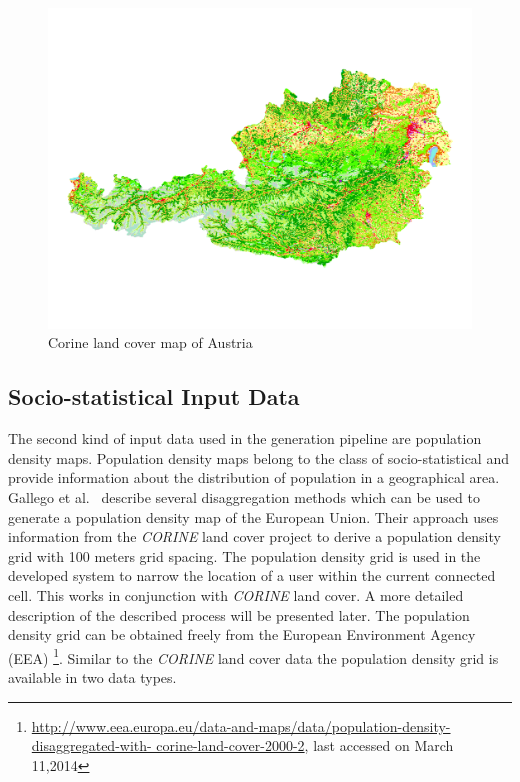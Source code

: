 \begin{figure}
	\centering
	\includegraphics[width=\linewidth]{./images/clc_austria}
	\caption{Corine land cover map of Austria}
	\label{fig:clc_austria}
\end{figure}

\subsection{Socio-statistical Input Data}
The second kind of input data used in the generation pipeline are population density maps. Population density maps belong to the class of socio-statistical and provide information about the distribution of population in a geographical area. Gallego et al.\ \cite{Gallego2010,Gallego2011} describe several disaggregation methods which can be used to generate a population density map of the European Union.
Their approach uses information from the \emph{CORINE} land cover project to derive a population density grid with 100 meters grid spacing. The population density grid is used in the developed system to narrow the location of a user within the current connected cell. This works in conjunction with \emph{CORINE} land cover. A more detailed description of the described process will be presented later.
The population density grid can be obtained freely from the European Environment Agency (EEA) \footnote{\url{http://www.eea.europa.eu/data-and-maps/data/population-density-disaggregated-with-
	corine-land-cover-2000-2}, last accessed on March 11,2014}. Similar to the \emph{CORINE} land cover data the population density grid is available in two data types.

